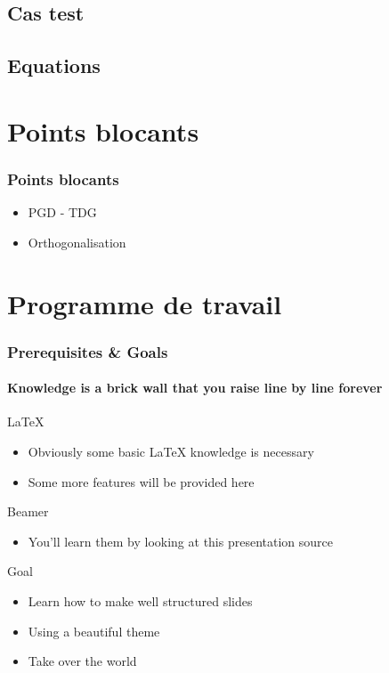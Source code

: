 \documentclass[12pt]{beamer}
\begin{document}
\subsection{Cas test}
\subsection{Equations}
\section{Points blocants}

\begin{frame}

\frametitle{Points blocants}

\begin{itemize}
	\item PGD - TDG
	\item Orthogonalisation
\end{itemize}

\end{frame}

\section{Programme de travail}

\begin{frame}

\frametitle{Prerequisites \& Goals}
\framesubtitle{Knowledge is a brick wall that you raise line by line forever}

\begin{block}{LaTeX}
  \begin{itemize}
    \item Obviously some basic LaTeX knowledge is necessary
    \item Some more features will be provided here
  \end{itemize}
\end{block}

\begin{block}{Beamer}
  \begin{itemize}
    \item You'll learn them by looking at this presentation source
  \end{itemize}
\end{block}

\begin{block}{Goal}
  \begin{itemize}
    \item Learn how to make well structured slides
    \item Using a beautiful theme
    \item Take over the world
  \end{itemize}
\end{block}

\end{frame}

\end{document}
